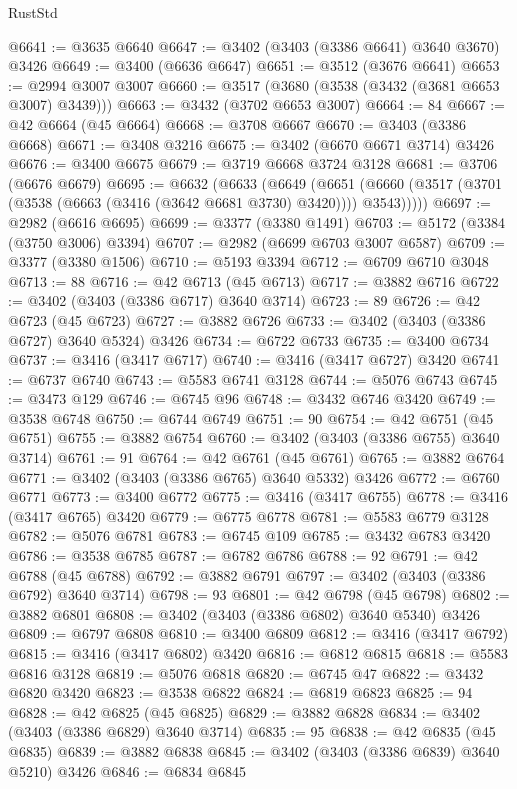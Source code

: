 \begin{lexlean}{RustStd}
\begin{coremodule}
@6641 := @3635 @6640
@6647 := @3402 (@3403 (@3386 @6641) @3640 @3670) @3426
@6649 := @3400 (@6636 @6647)
@6651 := @3512 (@3676 @6641)
@6653 := @2994 @3007 @3007
@6660 := @3517 (@3680 (@3538 (@3432 (@3681 @6653 @3007) @3439)))
@6663 := @3432 (@3702 @6653 @3007)
@6664 := 84
@6667 := @42 @6664 (@45 @6664)
@6668 := @3708 @6667
@6670 := @3403 (@3386 @6668)
@6671 := @3408 @3216
@6675 := @3402 (@6670 @6671 @3714) @3426
@6676 := @3400 @6675
@6679 := @3719 @6668 @3724 @3128
@6681 := @3706 (@6676 @6679)
@6695 := @6632
    (@6633
      (@6649
        (@6651 (@6660 (@3517 (@3701 (@3538 (@6663 (@3416 (@3642 @6681 @3730) @3420)))) @3543)))))
@6697 := @2982 (@6616 @6695)
@6699 := @3377 (@3380 @1491)
@6703 := @5172 (@3384 (@3750 @3006) @3394)
@6707 := @2982 (@6699 @6703 @3007 @6587)
@6709 := @3377 (@3380 @1506)
@6710 := @5193 @3394
@6712 := @6709 @6710 @3048
@6713 := 88
@6716 := @42 @6713 (@45 @6713)
@6717 := @3882 @6716
@6722 := @3402 (@3403 (@3386 @6717) @3640 @3714)
@6723 := 89
@6726 := @42 @6723 (@45 @6723)
@6727 := @3882 @6726
@6733 := @3402 (@3403 (@3386 @6727) @3640 @5324) @3426
@6734 := @6722 @6733
@6735 := @3400 @6734
@6737 := @3416 (@3417 @6717)
@6740 := @3416 (@3417 @6727) @3420
@6741 := @6737 @6740
@6743 := @5583 @6741 @3128
@6744 := @5076 @6743
@6745 := @3473 @129
@6746 := @6745 @96
@6748 := @3432 @6746 @3420
@6749 := @3538 @6748
@6750 := @6744 @6749
@6751 := 90
@6754 := @42 @6751 (@45 @6751)
@6755 := @3882 @6754
@6760 := @3402 (@3403 (@3386 @6755) @3640 @3714)
@6761 := 91
@6764 := @42 @6761 (@45 @6761)
@6765 := @3882 @6764
@6771 := @3402 (@3403 (@3386 @6765) @3640 @5332) @3426
@6772 := @6760 @6771
@6773 := @3400 @6772
@6775 := @3416 (@3417 @6755)
@6778 := @3416 (@3417 @6765) @3420
@6779 := @6775 @6778
@6781 := @5583 @6779 @3128
@6782 := @5076 @6781
@6783 := @6745 @109
@6785 := @3432 @6783 @3420
@6786 := @3538 @6785
@6787 := @6782 @6786
@6788 := 92
@6791 := @42 @6788 (@45 @6788)
@6792 := @3882 @6791
@6797 := @3402 (@3403 (@3386 @6792) @3640 @3714)
@6798 := 93
@6801 := @42 @6798 (@45 @6798)
@6802 := @3882 @6801
@6808 := @3402 (@3403 (@3386 @6802) @3640 @5340) @3426
@6809 := @6797 @6808
@6810 := @3400 @6809
@6812 := @3416 (@3417 @6792)
@6815 := @3416 (@3417 @6802) @3420
@6816 := @6812 @6815
@6818 := @5583 @6816 @3128
@6819 := @5076 @6818
@6820 := @6745 @47
@6822 := @3432 @6820 @3420
@6823 := @3538 @6822
@6824 := @6819 @6823
@6825 := 94
@6828 := @42 @6825 (@45 @6825)
@6829 := @3882 @6828
@6834 := @3402 (@3403 (@3386 @6829) @3640 @3714)
@6835 := 95
@6838 := @42 @6835 (@45 @6835)
@6839 := @3882 @6838
@6845 := @3402 (@3403 (@3386 @6839) @3640 @5210) @3426
@6846 := @6834 @6845

\end{coremodule}
\end{lexlean}
